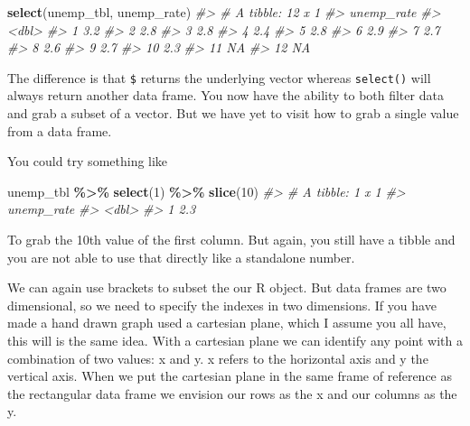 \documentclass[
]{book}
\newenvironment{Shaded}{\begin{snugshade}}{\end{snugshade}}
\newcommand{\CommentTok}[1]{\textcolor[rgb]{0.56,0.35,0.01}{\textit{#1}}}
\newcommand{\DecValTok}[1]{\textcolor[rgb]{0.00,0.00,0.81}{#1}}
\newcommand{\KeywordTok}[1]{\textcolor[rgb]{0.13,0.29,0.53}{\textbf{#1}}}
\newcommand{\NormalTok}[1]{#1}
\newcommand{\OperatorTok}[1]{\textcolor[rgb]{0.81,0.36,0.00}{\textbf{#1}}}
\newcommand{\StringTok}[1]{\textcolor[rgb]{0.31,0.60,0.02}{#1}}
\begin{document}
\begin{Shaded}
\begin{Highlighting}[]
\KeywordTok{select}\NormalTok{(unemp\_tbl, unemp\_rate)}
\CommentTok{\#\textgreater{} \# A tibble: 12 x 1}
\CommentTok{\#\textgreater{}    unemp\_rate}
\CommentTok{\#\textgreater{}         \textless{}dbl\textgreater{}}
\CommentTok{\#\textgreater{}  1        3.2}
\CommentTok{\#\textgreater{}  2        2.8}
\CommentTok{\#\textgreater{}  3        2.8}
\CommentTok{\#\textgreater{}  4        2.4}
\CommentTok{\#\textgreater{}  5        2.8}
\CommentTok{\#\textgreater{}  6        2.9}
\CommentTok{\#\textgreater{}  7        2.7}
\CommentTok{\#\textgreater{}  8        2.6}
\CommentTok{\#\textgreater{}  9        2.7}
\CommentTok{\#\textgreater{} 10        2.3}
\CommentTok{\#\textgreater{} 11       NA  }
\CommentTok{\#\textgreater{} 12       NA}
\end{Highlighting}
\end{Shaded}

The difference is that \texttt{\$} returns the underlying vector whereas \texttt{select()} will always return another data frame. You now have the ability to both filter data and grab a subset of a vector. But we have yet to visit how to grab a single value from a data frame.

You could try something like

\begin{Shaded}
\begin{Highlighting}[]
\NormalTok{unemp\_tbl }\OperatorTok{\%\textgreater{}\%}\StringTok{ }
\StringTok{  }\KeywordTok{select}\NormalTok{(}\DecValTok{1}\NormalTok{) }\OperatorTok{\%\textgreater{}\%}\StringTok{ }
\StringTok{  }\KeywordTok{slice}\NormalTok{(}\DecValTok{10}\NormalTok{)}
\CommentTok{\#\textgreater{} \# A tibble: 1 x 1}
\CommentTok{\#\textgreater{}   unemp\_rate}
\CommentTok{\#\textgreater{}        \textless{}dbl\textgreater{}}
\CommentTok{\#\textgreater{} 1        2.3}
\end{Highlighting}
\end{Shaded}

To grab the 10th value of the first column. But again, you still have a tibble and you are not able to use that directly like a standalone number.

We can again use brackets to subset the our R object. But data frames are two dimensional, so we need to specify the indexes in two dimensions. If you have made a hand drawn graph used a cartesian plane, which I assume you all have, this will is the same idea. With a cartesian plane we can identify any point with a combination of two values: x and y. x refers to the horizontal axis and y the vertical axis. When we put the cartesian plane in the same frame of reference as the rectangular data frame we envision our rows as the x and our columns as the y.
\end{document}
